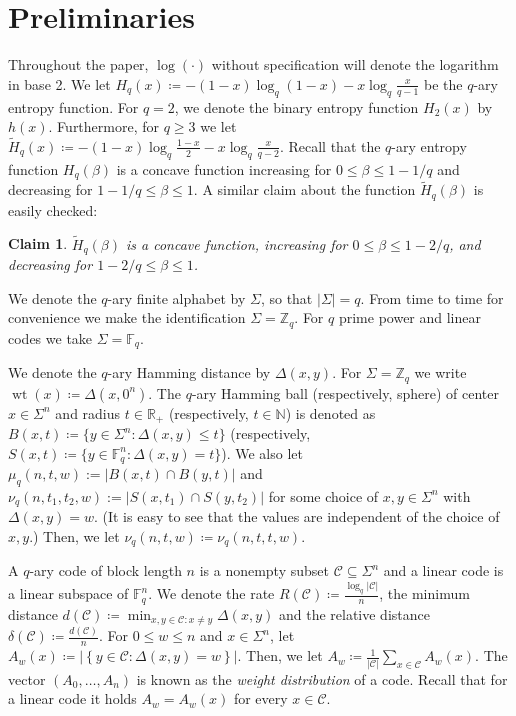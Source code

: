\documentclass{article}
\newcommand{\Htilde}{\tilde{H}}
\DeclareMathOperator{\wt}{wt}
\newcommand{\cC}{\mathcal{C}}
\newcommand{\bF}{\mathbb{F}}
\theoremstyle{plain}
\theoremstyle{plain}
\theoremstyle{plain}
\theoremstyle{plain}
\theoremstyle{plain}
\theoremstyle{plain}
\newtheorem{claim}[definition]{Claim}%
\theoremstyle{plain}
\theoremstyle{plain}
\theoremstyle{plain}
\theoremstyle{plain}
\theoremstyle{remark}
\theoremstyle{remark}
\theoremstyle{remark}
\theoremstyle{plain}
\begin{document}
\section{Preliminaries}
\label{sec:preliminaries}
Throughout the paper, $\log(\cdot)$ without specification will denote the logarithm in base 2. 
We let $H_q(x)\coloneqq -(1-x)\log_q(1-x)-x\log_q\frac{x}{q-1}$ be the $q$-ary entropy function. For $q=2$, we denote the binary entropy function $H_2(x)$ by $h(x)$. Furthermore, for $q\ge 3$
we let 
$\Htilde_q(x)\coloneqq -(1-x)\log_q\frac{1-x}{2}
-x\log_q\frac{x}{q-2}$.
Recall that the $q$-ary
entropy function $H_q(\beta)$ is
a concave function increasing
for $0\le \beta\le1-1/q$ and
decreasing for $1-1/q\le\beta\le 1$.
A similar claim about the function
$\Htilde_q(\beta)$ is easily checked:
\begin{claim}
     \label{clm:3}
     $\tilde{H}_q(\beta)$ is a concave function,
     increasing for $0\le\beta\le1-2/q$, and 
     decreasing for $1-2/q\le\beta\le 1$.
\end{claim}

We denote the $q$-ary finite alphabet
by $\Sigma$, so that $|\Sigma|=q$.
From time to time for convenience we make
the identification $\Sigma=\mathbb{Z}_q$.
For $q$ prime power and linear codes we take
$\Sigma=\mathbb{F}_q$.

We denote the $q$-ary Hamming distance by $\Delta(x,y)$.
For $\Sigma=\mathbb{Z}_q$ we write $\wt(x)\coloneqq \Delta(x,0^n)$.
The $q$-ary Hamming ball (respectively, sphere) of center $x\in\Sigma^n$ and radius $t\in\mathbb{R}_+$ (respectively, $t\in\mathbb{N}$) is denoted as $B(x,t)\coloneqq\{y\in\Sigma^n: \Delta(x,y)\le t\}$ (respectively, $S(x,t)\coloneqq\{y\in\bF_q^n: \Delta(x,y)= t\}$).
We also let
$\mu_q(n,t,w):=|B(x,t)\cap B(y,t)|$ and $\nu_q(n,t_1,t_2,w):=|S(x,t_1)\cap S(y,t_2)|$ for some choice
of $x,y\in\Sigma^n$ with $\Delta(x,y)=w$.
(It is easy to see that the values
are independent of the choice of $x,y$.)
Then, we let $\nu_q(n,t,w)\coloneqq
\nu_q(n,t,t,w)$.

A $q$-ary code of block length $n$ is a 
nonempty subset $\cC\subseteq\Sigma^n$
and a linear code is a linear subspace of
$\mathbb{F}_q^n$. We denote the rate
$R(\cC)\coloneqq \frac{\log_q|\cC|}{n}$,
the minimum distance $d(\cC)\coloneqq\min_{x,y\in \cC: x\ne y}\Delta(x,y)$ and the relative distance
$\delta(\cC)\coloneqq \frac{d(\cC)}{n}$.
For $0\le w\le n$ and $x\in\Sigma^n$,
let $A_w(x)\coloneqq
\left|\left\{
y\in\cC:\Delta(x,y)=w
\right\}\right|$.
Then, we let 
$A_w\coloneqq \frac{1}{|\cC|}\sum_{x\in\cC}A_w(x)$.
The vector $(A_0,\ldots,A_n)$ is known as the
\emph{weight distribution} of a code.
Recall that for a linear code it holds
$A_w=A_w(x)$ for every $x\in\cC$.
\end{document}
